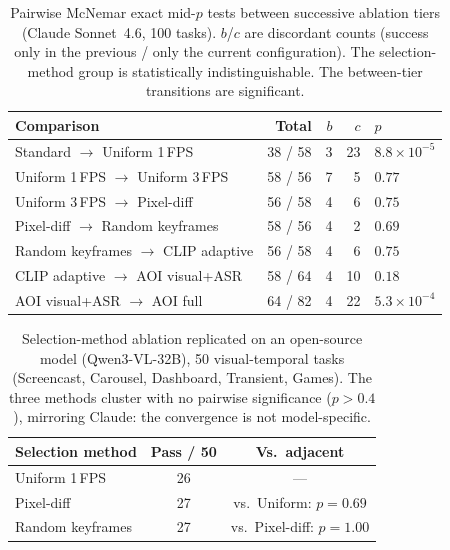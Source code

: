 \documentclass[11pt]{article}
\begin{document}
\begin{table}[!h]
\centering
\caption{Pairwise McNemar exact mid-$p$ tests between successive ablation tiers
(Claude Sonnet~4.6, 100 tasks). $b$/$c$ are discordant counts (success only in
the previous / only the current configuration). The selection-method group is
statistically indistinguishable. The between-tier transitions are significant.}
\label{tab:ablation_stats}
\small
\begin{tabular}{@{}l rrr l@{}}
\toprule
\textbf{Comparison} & \textbf{Total} & \textbf{$b$} & \textbf{$c$} & \textbf{$p$} \\
\midrule
Standard $\to$ Uniform 1\,FPS         & 38 / 58 & 3 & 23 & $8.8 \times 10^{-5}$ \\
Uniform 1\,FPS $\to$ Uniform 3\,FPS   & 58 / 56 & 7 & 5  & $0.77$ \\
Uniform 3\,FPS $\to$ Pixel-diff       & 56 / 58 & 4 & 6  & $0.75$ \\
Pixel-diff $\to$ Random keyframes      & 58 / 56 & 4 & 2  & $0.69$ \\
Random keyframes $\to$ CLIP adaptive   & 56 / 58 & 4 & 6  & $0.75$ \\
CLIP adaptive $\to$ AOI visual+ASR     & 58 / 64 & 4 & 10 & $0.18$ \\
AOI visual+ASR $\to$ AOI full          & 64 / 82 & 4 & 22 & $5.3 \times 10^{-4}$ \\
\bottomrule
\end{tabular}
\end{table}

\begin{table}[!h]
\centering
\caption{Selection-method ablation replicated on an open-source model
(Qwen3-VL-32B), 50 visual-temporal tasks (Screencast, Carousel, Dashboard,
Transient, Games). The three methods cluster with no pairwise significance
($p>0.4$), mirroring Claude: the convergence is not model-specific.}
\label{tab:oss_selection}
\small
\begin{tabular}{@{}l c c@{}}
\toprule
\textbf{Selection method} & \textbf{Pass / 50} & \textbf{Vs.\ adjacent} \\
\midrule
Uniform 1\,FPS    & 26 & --- \\
Pixel-diff        & 27 & vs.\ Uniform: $p=0.69$ \\
Random keyframes  & 27 & vs.\ Pixel-diff: $p=1.00$ \\
\bottomrule
\end{tabular}
\end{table}
\end{document}
